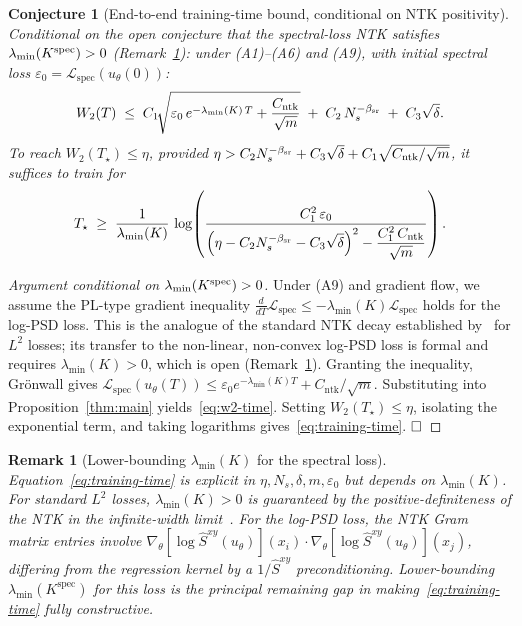 \documentclass[review,12pt]{elsarticle}
\newtheorem{remark}{Remark}
\newtheorem{conjecture}{Conjecture}
\begin{document}
\begin{conjecture}[End-to-end training-time bound, conditional on
NTK positivity]
\label{prop:ntk}
\emph{Conditional on the open conjecture that the spectral-loss NTK
satisfies $\lambda_{\min}(K^{\rm spec}) > 0$
(Remark~\ref{rem:lambda-min}):} under (A1)--(A6) and (A9), with
initial spectral loss
$\varepsilon_0=\mathcal{L}_{\mathrm{spec}}(u_\theta(0))$:
\begin{equation}
\label{eq:w2-time}
W_2(T)\;\le\;
C_1\!\sqrt{\varepsilon_0\,e^{-\lambda_{\min}(K)\,T}
+\frac{C_{\mathrm{ntk}}}{\sqrt{m}}}
\;+\;C_2\,N_s^{-\beta_{\rm sr}}\;+\;C_3\sqrt\delta.
\end{equation}
To reach $W_2(T_\star)\le\eta$, provided
$\eta>C_2 N_s^{-\beta_{\rm sr}}+C_3\sqrt\delta
+C_1\sqrt{C_{\mathrm{ntk}}/\sqrt{m}}$,
it suffices to train for
\begin{equation}
\label{eq:training-time}
T_\star\;\ge\;
\frac{1}{\lambda_{\min}(K)}\,
\log\!\left(
\frac{C_1^2\,\varepsilon_0}
{\displaystyle\Bigl(\eta-C_2 N_s^{-\beta_{\rm sr}}-C_3\sqrt\delta\Bigr)^2
-\dfrac{C_1^2\,C_{\mathrm{ntk}}}{\sqrt{m}}}
\right).
\end{equation}
\end{conjecture}

\begin{proof}[Argument conditional on $\lambda_{\min}(K^{\rm spec}) > 0$]
Under (A9) and gradient flow, we assume the PL-type gradient
inequality
$\tfrac{d}{dT}\mathcal{L}_{\mathrm{spec}}
\le -\lambda_{\min}(K)\mathcal{L}_{\mathrm{spec}}$
holds for the log-PSD loss. This is the analogue of the standard
NTK decay established by~\cite{Wang2022} for $L^2$ losses; its
transfer to the non-linear, non-convex log-PSD loss is formal and
requires $\lambda_{\min}(K)>0$, which is open (Remark~\ref{rem:lambda-min}).
Granting the inequality, Gr\"onwall gives
$\mathcal{L}_{\mathrm{spec}}(u_\theta(T))
\le\varepsilon_0 e^{-\lambda_{\min}(K)T}+C_{\mathrm{ntk}}/\sqrt{m}$.
Substituting into Proposition~\ref{thm:main} yields~\eqref{eq:w2-time}.
Setting $W_2(T_\star)\le\eta$, isolating the exponential term, and
taking logarithms gives~\eqref{eq:training-time}.
$\hfill\square$
\end{proof}

\begin{remark}[Lower-bounding $\lambda_{\min}(K)$ for the spectral loss]
\label{rem:lambda-min}
Equation~\eqref{eq:training-time} is explicit in $\eta,N_s,\delta,m,\varepsilon_0$
but depends on $\lambda_{\min}(K)$.
For standard $L^2$ losses, $\lambda_{\min}(K)>0$ is guaranteed by the
positive-definiteness of the NTK in the infinite-width
limit~\cite{Wang2022}. For the log-PSD loss, the NTK Gram matrix
entries involve $\nabla_\theta[\log\widehat{S}^{xy}(u_\theta)](x_i)
\cdot\nabla_\theta[\log\widehat{S}^{xy}(u_\theta)](x_j)$,
differing from the regression kernel by a $1/\widehat{S}^{xy}$
preconditioning. Lower-bounding $\lambda_{\min}(K^{\mathrm{spec}})$
for this loss is the principal remaining gap in
making~\eqref{eq:training-time} fully constructive.
\end{remark}
\end{document}
